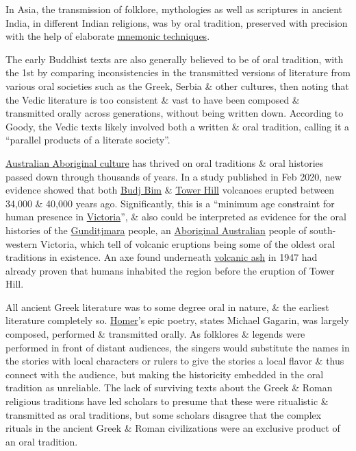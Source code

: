 \documentclass[oneside]{book}
\numberwithin{equation}{section}
\begin{document}
In Asia, the transmission of folklore, mythologies as well as scriptures in ancient India, in different Indian religions, was by oral tradition, preserved with precision with the help of elaborate \href{https://en.wikipedia.org/wiki/Vedic_chant}{mnemonic techniques}.

The early Buddhist texts are also generally believed to be of oral tradition, with the 1st by comparing inconsistencies in the transmitted versions of literature from various oral societies such as the Greek, Serbia \& other cultures, then noting that the Vedic literature is too consistent \& vast to have been composed \& transmitted orally across generations, without being written down. According to Goody, the Vedic texts likely involved both a written \& oral tradition, calling it a ``parallel products of a literate society''.

\href{https://en.wikipedia.org/wiki/Australian_Aboriginal_culture}{Australian Aboriginal culture} has thrived on oral traditions \& oral histories passed down through thousands of years. In a study published in Feb 2020, new evidence showed that both \href{https://en.wikipedia.org/wiki/Budj_Bim}{Budj Bim} \& \href{https://en.wikipedia.org/wiki/Tower_Hill_(volcano)}{Tower Hill} volcanoes erupted between 34,000 \& 40,000 years ago. Significantly, this is a ``minimum age constraint for human presence in \href{https://en.wikipedia.org/wiki/Victoria,_Australia}{Victoria}'', \& also could be interpreted as evidence for the oral histories of the \href{https://en.wikipedia.org/wiki/Gunditjmara}{Gunditjmara} people, an \href{https://en.wikipedia.org/wiki/Aboriginal_Australian}{Aboriginal Australian} people of south-western Victoria, which tell of volcanic eruptions being some of the oldest oral traditions in existence. An axe found underneath \href{https://en.wikipedia.org/wiki/Volcanic_ash}{volcanic ash} in 1947 had already proven that humans inhabited the region before the eruption of Tower Hill.

All ancient Greek literature was to some degree oral in nature, \& the earliest literature completely so. \href{https://en.wikipedia.org/wiki/Homer}{Homer}'s epic poetry, states Michael Gagarin, was largely composed, performed \& transmitted orally. As folklores \& legends were performed in front of distant audiences, the singers would substitute the names in the stories with local characters or rulers to give the stories a local flavor \& thus connect with the audience, but making the historicity embedded in the oral tradition as unreliable. The lack of surviving texts about the Greek \& Roman religious traditions have led scholars to presume that these were ritualistic \& transmitted as oral traditions, but some scholars disagree that the complex rituals in the ancient Greek \& Roman civilizations were an exclusive product of an oral tradition.
\end{document}
